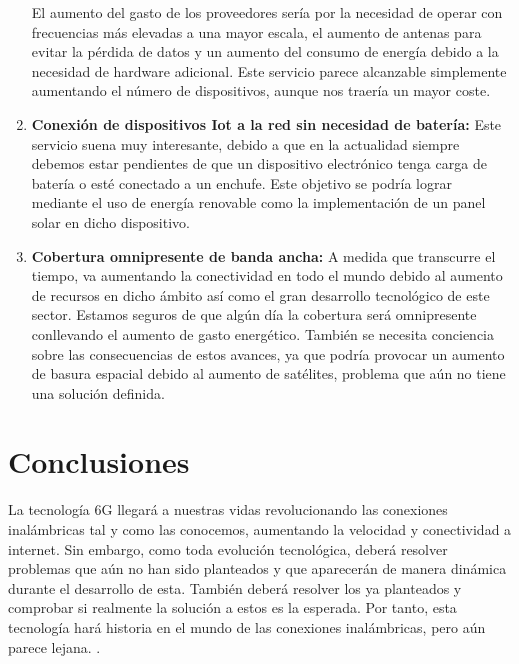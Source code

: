 \begin{enumerate}
El aumento del gasto de los proveedores sería por la necesidad de operar con frecuencias más elevadas a una mayor escala, el aumento de antenas para evitar la pérdida de datos y un aumento del consumo de energía debido a la necesidad de hardware adicional. Este servicio parece alcanzable simplemente aumentando el número de dispositivos, aunque nos traería un mayor coste.
\item {\bfseries Conexión de dispositivos Iot a la red sin necesidad de batería:  }
Este servicio suena muy interesante, debido a que en la actualidad siempre debemos estar pendientes de que un dispositivo electrónico tenga carga de batería o esté conectado a un enchufe. Este objetivo se podría lograr mediante el uso de energía renovable como la implementación de un panel solar en dicho dispositivo.
\item {\bfseries Cobertura omnipresente de banda ancha:  }
A medida que transcurre el tiempo, va aumentando la conectividad en todo el mundo debido al aumento de recursos en dicho ámbito así como el gran desarrollo tecnológico de este sector. Estamos seguros de que algún día la cobertura será omnipresente conllevando el aumento de gasto energético. También se necesita conciencia sobre las consecuencias de estos avances, ya que podría provocar un aumento de basura espacial debido al aumento de satélites, problema que aún no tiene una solución definida.
\end{enumerate}

\section{Conclusiones}
\label{sec:conclusiones}
La tecnología 6G llegará a nuestras vidas revolucionando las conexiones inalámbricas tal y como las conocemos, aumentando la velocidad y conectividad a internet.
Sin embargo, como toda evolución tecnológica, deberá resolver problemas que aún no han sido planteados y que aparecerán de manera dinámica durante el desarrollo de esta. También deberá resolver los ya planteados y comprobar si realmente la solución a estos es la esperada.
Por tanto, esta tecnología hará historia en el mundo de las conexiones inalámbricas, pero aún parece lejana.
.\nocite{6G}

          





